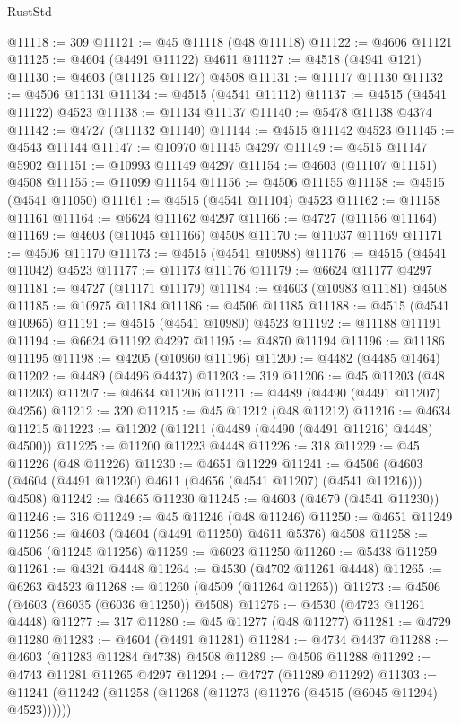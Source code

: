 \begin{lexlean}{RustStd}
\begin{coremodule}
@11118 := 309
@11121 := @45 @11118 (@48 @11118)
@11122 := @4606 @11121
@11125 := @4604 (@4491 @11122) @4611
@11127 := @4518 (@4941 @121)
@11130 := @4603 (@11125 @11127) @4508
@11131 := @11117 @11130
@11132 := @4506 @11131
@11134 := @4515 (@4541 @11112)
@11137 := @4515 (@4541 @11122) @4523
@11138 := @11134 @11137
@11140 := @5478 @11138 @4374
@11142 := @4727 (@11132 @11140)
@11144 := @4515 @11142 @4523
@11145 := @4543 @11144
@11147 := @10970 @11145 @4297
@11149 := @4515 @11147 @5902
@11151 := @10993 @11149 @4297
@11154 := @4603 (@11107 @11151) @4508
@11155 := @11099 @11154
@11156 := @4506 @11155
@11158 := @4515 (@4541 @11050)
@11161 := @4515 (@4541 @11104) @4523
@11162 := @11158 @11161
@11164 := @6624 @11162 @4297
@11166 := @4727 (@11156 @11164)
@11169 := @4603 (@11045 @11166) @4508
@11170 := @11037 @11169
@11171 := @4506 @11170
@11173 := @4515 (@4541 @10988)
@11176 := @4515 (@4541 @11042) @4523
@11177 := @11173 @11176
@11179 := @6624 @11177 @4297
@11181 := @4727 (@11171 @11179)
@11184 := @4603 (@10983 @11181) @4508
@11185 := @10975 @11184
@11186 := @4506 @11185
@11188 := @4515 (@4541 @10965)
@11191 := @4515 (@4541 @10980) @4523
@11192 := @11188 @11191
@11194 := @6624 @11192 @4297
@11195 := @4870 @11194
@11196 := @11186 @11195
@11198 := @4205 (@10960 @11196)
@11200 := @4482 (@4485 @1464)
@11202 := @4489 (@4496 @4437)
@11203 := 319
@11206 := @45 @11203 (@48 @11203)
@11207 := @4634 @11206
@11211 := @4489 (@4490 (@4491 @11207) @4256)
@11212 := 320
@11215 := @45 @11212 (@48 @11212)
@11216 := @4634 @11215
@11223 := @11202 (@11211 (@4489 (@4490 (@4491 @11216) @4448) @4500))
@11225 := @11200 @11223 @4448
@11226 := 318
@11229 := @45 @11226 (@48 @11226)
@11230 := @4651 @11229
@11241 := @4506 (@4603 (@4604 (@4491 @11230) @4611 (@4656 (@4541 @11207) (@4541 @11216))) @4508)
@11242 := @4665 @11230
@11245 := @4603 (@4679 (@4541 @11230))
@11246 := 316
@11249 := @45 @11246 (@48 @11246)
@11250 := @4651 @11249
@11256 := @4603 (@4604 (@4491 @11250) @4611 @5376) @4508
@11258 := @4506 (@11245 @11256)
@11259 := @6023 @11250
@11260 := @5438 @11259
@11261 := @4321 @4448
@11264 := @4530 (@4702 @11261 @4448)
@11265 := @6263 @4523
@11268 := @11260 (@4509 (@11264 @11265))
@11273 := @4506 (@4603 (@6035 (@6036 @11250)) @4508)
@11276 := @4530 (@4723 @11261 @4448)
@11277 := 317
@11280 := @45 @11277 (@48 @11277)
@11281 := @4729 @11280
@11283 := @4604 (@4491 @11281)
@11284 := @4734 @4437
@11288 := @4603 (@11283 @11284 @4738) @4508
@11289 := @4506 @11288
@11292 := @4743 @11281 @11265 @4297
@11294 := @4727 (@11289 @11292)
@11303 := @11241 (@11242 (@11258 (@11268 (@11273 (@11276 (@4515 (@6045 @11294) @4523))))))

\end{coremodule}
\end{lexlean}
